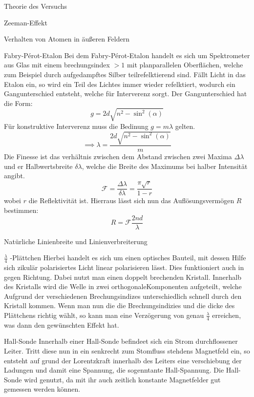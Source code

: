 \documentclass[pdftex, a4paper,11pt, twoside, ngerman]{report}
\begin{document}
\begin{chapter}{Theorie des Versuchs}
\begin{section}{Zeeman-Effekt}
\begin{subsection}{Verhalten von Atomen in äußeren Feldern}
        \end{subsection}
        \begin{subsection}{Fabry-Pérot-Etalon}
            Bei dem Fabry-Pérot-Etalon handelt es sich um Spektrometer aus Glas mit einem brechungsindex $>1$ mit planparallelen Oberflächen, welche zum Beispiel durch aufgedampftes Silber teilrefelktierend sind.
            Fällt Licht in das Etalon ein, so wird ein Teil des Lichtes immer wieder refelktiert, wodurch ein Gangunterschied entsteht, welche für Interverenz sorgt.
            Der Gangunterschied hat die Form:
            \[
                g = 2d\sqrt{n^2-\sin^2(\alpha)}
            \]
            Für konstruktive Interverenz muss die Bedinung $g = m\lambda$ gelten.
            \[
                \implies \lambda = \frac{2d\sqrt{n^2-\sin^2(\alpha)}}m
            \]
            Die Finesse ist das verhältnis zwischen dem Abstand zwischen zwei Maxima $\Delta\lambda$ und er Halbwertsbreite $\delta\lambda$, welche die Breite des Maximums bei halber Intensität angibt.
            \[
                \mathcal{F}=\frac{\Delta\lambda}{\delta\lambda} = \frac{\pi\sqrt r}{1-r}
            \]
            wobei $r$ die Reflektivität ist.
            Hierraus lässt sich nun das Auflösungsvermögen $R$ bestimmen:
            \[
                R = \mathcal{F}\frac{2nd}{\lambda}
            \]

            
        \end{subsection}
        \begin{subsection}{Natürliche Linienbreite und Linienverbreiterung}

        \end{subsection}
        \begin{subsection}{$\frac \lambda 4$ -Plättchen}
            Hierbei handelt es sich um einen optisches Bauteil, mit dessen Hilfe sich zikulär polarisiertes Licht linear polarisieren lässt. 
            Dies funktioniert auch in gegen Richtung. Dabei nutzt man einen doppelt brechenden Kristall. 
            Innerhalb des Kristalls wird die Welle in zwei orthogonaleKomponenten aufgeteilt, welche Aufgrund der verschiedenen Brechungsindizes unterschiedlich schnell durch den Kristall kommen.
            Wenn man nun die die Brechungsindizies und die dicke des Plättchens richtig wählt, so kann man eine Verzögerung von genau $\frac \lambda 4$ erreichen, was dann den gewünschten Effekt hat.

        \end{subsection}
        \begin{subsection}{Hall-Sonde}
            Innerhalb einer Hall-Sonde befindeet sich ein Strom durchflossener Leiter. 
            Tritt diese nun in ein senkrecht zum Stomfluss stehdens Magnetfeld ein, so entsteht auf grund der Lorentzkraft innerhalb des Leiters eine verschiebung der Ladungen und damit eine Spannung, die sogenntante Hall-Spannung.
            Die Hall-Sonde wird genutzt, da mit ihr auch zeitlich konstante Magnetfelder gut gemessen werden können.


\end{subsection}
\end{section}
\end{chapter}
\end{document}
